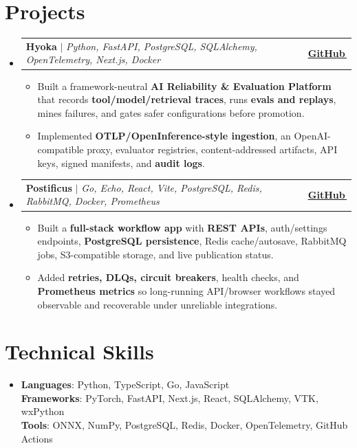 \documentclass[letterpaper,11pt]{article}
\makeatletter
\newcommand{\bodyhref}[2]{\href{#1}{\underline{#2}\,\faExternalLink*}}
\newcommand{\resumeItem}[1]{\item{\fontsize{10.2pt}{11.5pt}\selectfont #1\vspace{-0.1pt}}}
\newcommand{\resumeProjectHeading}[2]{
    \item
    \begin{tabular*}{1.001\textwidth}{l@{\extracolsep{\fill}}r}
      \small#1 & \textbf{\small #2}\\
    \end{tabular*}\vspace{-3pt}
}
\newcommand{\resumeSubHeadingListStart}{\begin{itemize}[leftmargin=0.0in, label={}, itemsep=1.5pt, topsep=0pt, parsep=0pt, partopsep=0pt]}
\newcommand{\resumeSubHeadingListEnd}{\end{itemize}}
\newcommand{\resumeItemListStart}{\begin{itemize}[leftmargin=0.16in,itemsep=1.0pt,topsep=2.0pt,parsep=0pt,partopsep=0pt]}
\newcommand{\resumeItemListEnd}{\end{itemize}\vspace{-1pt}}
\makeatother
\begin{document}
\section{Projects}
\resumeSubHeadingListStart
\resumeProjectHeading
{\textbf{Hyoka} $|$ \emph{Python, FastAPI, PostgreSQL, SQLAlchemy, OpenTelemetry, Next.js, Docker}}{\bodyhref{https://github.com/unichronic/hyoka}{GitHub}}
\resumeItemListStart
\resumeItem{Built a framework-neutral \textbf{AI Reliability \& Evaluation Platform} that records \textbf{tool/model/retrieval traces}, runs \textbf{evals and replays}, mines failures, and gates safer configurations before promotion.}
\resumeItem{Implemented \textbf{OTLP/OpenInference-style ingestion}, an OpenAI-compatible proxy, evaluator registries, content-addressed artifacts, API keys, signed manifests, and \textbf{audit logs}.}
\resumeItemListEnd
\resumeProjectHeading
{\textbf{Postificus} $|$ \emph{Go, Echo, React, Vite, PostgreSQL, Redis, RabbitMQ, Docker, Prometheus}}{\bodyhref{https://github.com/unichronic/postificus}{GitHub}}
\resumeItemListStart
\resumeItem{Built a \textbf{full-stack workflow app} with \textbf{REST APIs}, auth/settings endpoints, \textbf{PostgreSQL persistence}, Redis cache/autosave, RabbitMQ jobs, S3-compatible storage, and live publication status.}
\resumeItem{Added \textbf{retries, DLQs, circuit breakers}, health checks, and \textbf{Prometheus metrics} so long-running API/browser workflows stayed observable and recoverable under unreliable integrations.}
\resumeItemListEnd
\resumeSubHeadingListEnd

\section{Technical Skills}
\begin{itemize}[leftmargin=0.15in, label={}, topsep=0pt, itemsep=0pt, parsep=0pt, partopsep=0pt]
  \item{\fontsize{9.6pt}{10.0pt}\selectfont
   \textbf{Languages}{: Python, TypeScript, Go, JavaScript} \\
   \textbf{Frameworks}{: PyTorch, FastAPI, Next.js, React, SQLAlchemy, VTK, wxPython} \\
   \textbf{Tools}{: ONNX, NumPy, PostgreSQL, Redis, Docker, OpenTelemetry, GitHub Actions} \\
  }
\end{itemize}
\end{document}
